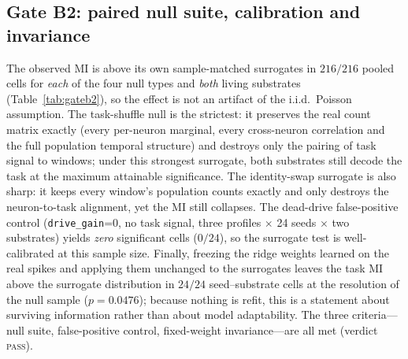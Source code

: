 \documentclass[10pt,a4paper]{article}
\begin{document}
\subsection{Gate B2: paired null suite, calibration and invariance}\label{sec:gateb2res}
\begin{table}[H]
\centering
\caption{Gate B2: per substrate and surrogate type, the number of
task-varying cells (profiles $\times$ seeds) with surrogate $p\le0.05$
out of $216$ (9 task profiles $\times$ 24 seeds), at $K=50$ paired
surrogates per cell. The identity-swap and task-shuffle nulls preserve
the exact per-window population envelope.}
\label{tab:gateb2}

\end{table}
The observed MI is above its own sample-matched surrogates in
$216/216$ pooled cells for \emph{each} of the four null types and
\emph{both} living substrates (Table~\ref{tab:gateb2}), so the effect is
not an artifact of the i.i.d.\ Poisson assumption. The task-shuffle
null is the strictest: it preserves the real count matrix exactly
(every per-neuron marginal, every cross-neuron correlation and the full
population temporal structure) and destroys only the pairing of task
signal to windows; under this strongest surrogate, both substrates still
decode the task at the maximum attainable significance. The identity-swap
surrogate is also sharp: it keeps every window's population
counts exactly and only destroys the neuron-to-task alignment, yet the
MI still collapses. The dead-drive false-positive control
(\texttt{drive\_gain}=0, no task signal, three profiles $\times$ 24
seeds $\times$ two substrates) yields \emph{zero} significant cells
($0/24$), so the surrogate test is well-calibrated at this sample size.
Finally, freezing the ridge weights learned on the real spikes and
applying them unchanged to the surrogates leaves the task MI above the
surrogate distribution in $24/24$ seed--substrate cells at the
resolution of the null sample ($p=0.0476$); because nothing is refit,
this is a statement about surviving information rather than about model
adaptability. The three criteria---null suite, false-positive control,
fixed-weight invariance---are all met (verdict \textsc{pass}).
\end{document}
